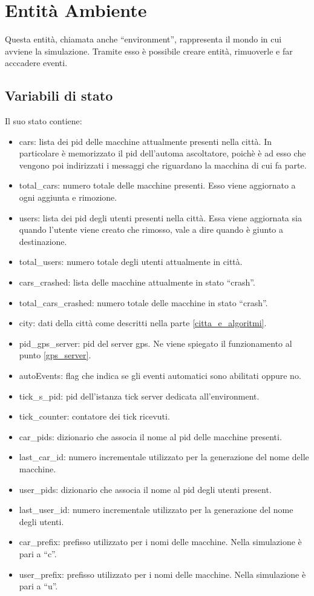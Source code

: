\section{Entità Ambiente}
Questa entità, chiamata anche ``environment'', rappresenta il mondo in cui avviene la simulazione. Tramite esso è possibile creare entità, rimuoverle e far acccadere eventi.

\subsection{Variabili di stato}
Il suo stato contiene:
\begin{itemize}
	\item cars: lista dei pid delle macchine attualmente presenti nella città. In particolare è memorizzato il pid dell'automa ascoltatore, poichè è ad esso che vengono poi indirizzati i messaggi che riguardano la macchina di cui fa parte.
	\item total\_cars: numero totale delle macchine presenti. Esso viene aggiornato a ogni aggiunta e rimozione.
	\item users: lista dei pid degli utenti presenti nella città. Essa viene aggiornata sia quando l'utente viene creato che rimosso, vale a dire quando è giunto a destinazione.
	\item total\_users: numero totale degli utenti attualmente in città.
	\item cars\_crashed: lista delle macchine attualmente in stato ``crash''.
	\item total\_cars\_crashed: numero totale delle macchine in stato ``crash''.
	\item city: dati della città come descritti nella parte \ref{citta_e_algoritmi}.
	\item pid\_gps\_server: pid del server gps. Ne viene spiegato il funzionamento al punto \ref{gps_server}.
	\item autoEvents: flag che indica se gli eventi automatici sono abilitati oppure no.
	\item tick\_s\_pid: pid dell'istanza tick server dedicata all'environment.
	\item tick\_counter: contatore dei tick ricevuti.
	\item car\_pids: dizionario che associa il nome al pid delle macchine presenti.
	\item last\_car\_id: numero incrementale utilizzato per la generazione del nome delle macchine.
	\item user\_pids: dizionario che associa il nome al pid degli utenti present.
	\item last\_user\_id: numero incrementale utilizzato per la generazione del nome degli utenti.
	\item car\_prefix: prefisso utilizzato per i nomi delle macchine. Nella simulazione è pari a ``c''.
	\item user\_prefix: prefisso utilizzato per i nomi delle macchine. Nella simulazione è pari a ``u''.
\end{itemize}

